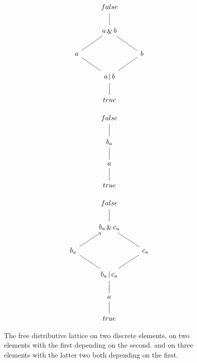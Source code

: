 \documentclass[hoptionsi,review,screen,format=acmsmall]{acmart}
\theoremstyle{definition}
\newcommand{\band}{\mathop{\&}}
\newcommand{\bor}{\mathop{|}}
\begin{document}
\begin{figure}
\begin{minipage}[c]{0.3\textwidth}
\begin{equation*}
\begin{tikzcd}
             & false                            &              \\
             & a \band b \arrow[u, no head]              &              \\
a \arrow[ru, no head] &                                 & b \arrow[lu, no head] \\
             & a \bor b \arrow[lu, no head] \arrow[ru, no head] &              \\
             & true \arrow[u, no head]                 &             
\end{tikzcd}
\end{equation*}
\end{minipage}
\begin{minipage}[c]{0.3\textwidth}
\begin{equation*}
\begin{tikzcd}
false                    \\
b_{a} \arrow[u, no head] \\
a \arrow[u, no head]     \\
true \arrow[u, no head] 
\end{tikzcd}
\end{equation*}
\end{minipage}
\begin{minipage}[c]{0.3\textwidth}
\begin{equation*}
\begin{tikzcd}
               & false                                                &                         \\
               & b_a \band c_a \arrow[u, no head]                     &                         \\
b_a \arrow[ru] &                                                      & c_a \arrow[lu, no head] \\
               & b_a \bor c_a \arrow[lu, no head] \arrow[ru, no head] &                         \\
               & a \arrow[u, no head]                                 &                         \\
               & true \arrow[u, no head]                              &                        
\end{tikzcd}
\end{equation*}
\end{minipage}
\caption{The free distributive lattice on two discrete elements,  on two elements with the first depending on the second. and on three elements with the latter two both depending on the first.}
\label{Fig5}
\end{figure}
\end{document}
